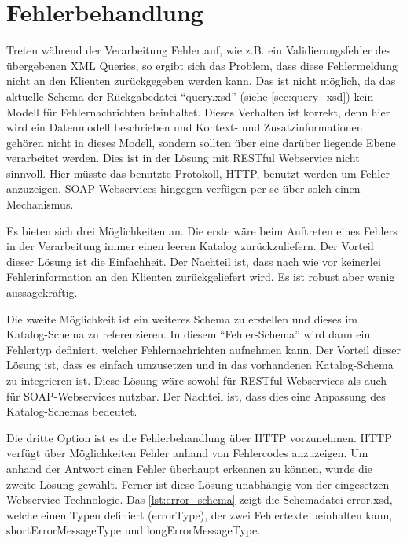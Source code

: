 \section{Fehlerbehandlung}

Treten während der Verarbeitung Fehler auf, wie z.B. ein Validierungsfehler des übergebenen XML Queries, so ergibt sich das Problem, dass diese Fehlermeldung nicht an den Klienten zurückgegeben werden kann. Das ist nicht möglich, da das aktuelle Schema der Rückgabedatei \enquote{query.xsd}  (siehe \autoref{sec:query_xsd}) kein Modell für Fehlernachrichten beinhaltet. Dieses Verhalten ist korrekt, denn hier wird ein Datenmodell beschrieben und Kontext- und Zusatzinformationen gehören nicht in dieses Modell, sondern sollten über eine darüber liegende Ebene verarbeitet werden. Dies ist in der Lösung mit \gls{REST}ful \gls{Webservice} nicht sinnvoll. Hier müsste das benutzte Protokoll, \gls{HTTP}, benutzt werden um Fehler anzuzeigen. \gls{SOAP}-\glspl{Webservice} hingegen verfügen per se über solch einen Mechanismus. 

Es bieten sich drei Möglichkeiten an. Die erste wäre beim Auftreten eines Fehlers in der Verarbeitung immer einen leeren Katalog zurückzuliefern. Der Vorteil dieser Lösung ist die Einfachheit. Der Nachteil ist, dass nach wie vor keinerlei Fehlerinformation an den Klienten zurückgeliefert wird. Es ist robust aber wenig aussagekräftig.

Die zweite Möglichkeit ist ein weiteres Schema zu erstellen und dieses im Katalog-Schema zu referenzieren. In diesem \enquote{Fehler-Schema} wird dann ein Fehlertyp definiert, welcher Fehlernachrichten aufnehmen kann. Der Vorteil dieser Lösung ist, dass es einfach umzusetzen und in das vorhandenen Katalog-Schema zu integrieren ist. Diese Lösung wäre sowohl für \gls{REST}ful \glspl{Webservice} als auch für \gls{SOAP}-\glspl{Webservice} nutzbar. Der Nachteil ist, dass dies eine Anpassung des Katalog-Schemas bedeutet. 

Die dritte Option ist es die Fehlerbehandlung über \gls{HTTP} vorzunehmen. \gls{HTTP} verfügt über Möglichkeiten Fehler anhand von Fehlercodes anzuzeigen. Um anhand der Antwort einen Fehler überhaupt erkennen zu können, wurde die zweite Lösung gewählt. Ferner ist diese Lösung unabhängig von der eingesetzen \gls{Webservice}-Technologie. Das \autoref{lst:error_schema} zeigt die Schemadatei error.xsd, welche einen Typen definiert (errorType), der zwei Fehlertexte beinhalten kann, shortErrorMessageType und longErrorMessageType. 

